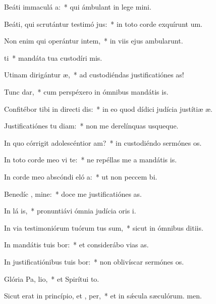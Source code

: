 \item Beáti immaculá  a:~* qui ámbulant in lege mini.
\item Beáti, qui scrutántur testimó jus:~* in toto corde exquírunt um.
\item Non enim qui operántur intem,~* in viis ejus ambularunt.
\item {} ti~* mandáta tua custodíri mis.
\item Utinam dirigántur  æ,~* ad custodiéndas justificatiónes as!
\item Tunc  dar,~* cum perspéxero in ómnibus mandátis is.
\item Confitébor tibi in directi dis:~* in eo quod dídici judícia justítiæ æ.
\item Justificatiónes tu diam:~* non me derelínquas usqueque.
\item In quo córrigit adolescéntior  am?~* in custodiéndo sermónes os.
\item In toto corde meo vi te:~* ne repéllas me a mandátis is.
\item In corde meo abscóndi eló a:~* ut non peccem bi.
\item Benedíc , mine:~* doce me justificatiónes as.
\item In lá is,~* pronuntiávi ómnia judícia oris i.
\item In via testimoniórum tuórum tus sum,~* sicut in ómnibus ditiis.
\item In mandátis tuis bor:~* et considerábo vias as.
\item In justificatiónibus tuis bor:~* non oblivíscar sermónes os.
\item Glória Pa,  lio,~* et Spirítui to.
\item Sicut erat in princípio, et ,  per,~* et in sǽcula sæculórum. men.
